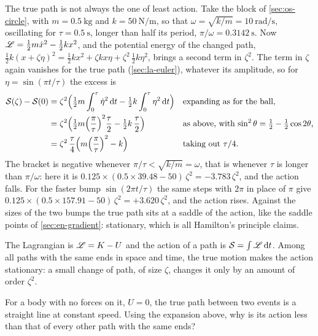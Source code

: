 The true path is not always the one of least action. Take the block of
\cref{sec:os-circle}, with $m = \SI{0.5}{\kilogram}$ and $k =
\SI{50}{\newton\per\metre}$, so that $\omega = \sqrt{k/m} =
\SI{10}{\radian\per\second}$, oscillating for $\tau = \SI{0.5}{\second}$,
longer than half its period, $\pi/\omega = \SI{0.3142}{\second}$. Now
$\mathscr{L} = \frac12 m\dot{x}^2 - \frac12 kx^2$, and the potential energy of the
changed path, $\frac12 k(x + \zeta\eta)^2 = \frac12 kx^2 + \zeta kx\eta +
\zeta^2\,\frac12 k\eta^2$, brings a second term in $\zeta^2$. The term in
$\zeta$ again vanishes for the true path (\cref{sec:la-euler}), whatever
its amplitude, so for $\eta = \sin(\pi t/\tau)$ the excess is
\begin{align*}
   \mathcal{S}(\zeta) - \mathcal{S}(0)
   &= \zeta^2\Bigl(\tfrac12 m\int_0^\tau\dot\eta^2\,\mathrm{d} t
      - \tfrac12 k\int_0^\tau\eta^2\,\mathrm{d} t\Bigr)
      && \text{expanding as for the ball,}\\
   &= \zeta^2\Bigl(\tfrac12 m\Bigl(\frac{\pi}{\tau}\Bigr)^2\frac{\tau}{2}
      - \tfrac12 k\,\frac{\tau}{2}\Bigr)
      && \text{as above, with $\sin^2\theta = \tfrac12 - \tfrac12\cos2\theta$,}\\
   &= \zeta^2\,\frac{\tau}{4}\Bigl(m\Bigl(\frac{\pi}{\tau}\Bigr)^2 - k\Bigr)
      && \text{taking out $\tau/4$.}
\end{align*}
The bracket is negative whenever $\pi/\tau < \sqrt{k/m} = \omega$, that is
whenever $\tau$ is longer than $\pi/\omega$: here it is $0.125\times(0.5
\times39.48 - 50)\,\zeta^2 = -3.783\,\zeta^2$, and the action falls. For the
faster bump $\sin(2\pi t/\tau)$ the same steps with $2\pi$ in place of $\pi$
give $0.125\times(0.5\times157.91 - 50)\,\zeta^2 = +3.620\,\zeta^2$, and the
action rises. Against the sizes of the two bumps the true path sits at a
saddle of the action, like the saddle points of \cref{sec:en-gradient}:
stationary, which is all Hamilton's principle claims.

\begin{keyidea}
The Lagrangian is $\mathscr{L} = K - U$ and the action of a path is $\mathcal{S} =
\int\mathscr{L}\,\mathrm{d} t$. Among all paths with the same ends in space and time,
the true motion makes the action stationary: a small change of path, of
size $\zeta$, changes it only by an amount of order $\zeta^2$.
\end{keyidea}


\begin{selfcheck}
For a body with no forces on it, $U = 0$, the true path between two
events is a straight line at constant speed. Using the expansion above,
why is its action less than that of every other path with the same ends?
\end{selfcheck}
